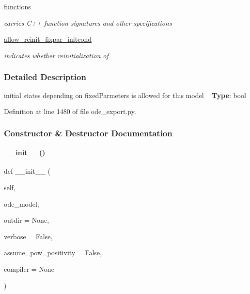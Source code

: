 \begin{DoxyCompactItemize}
\mbox{\hyperlink{classamici_1_1ode__export_1_1_o_d_e_exporter_a2cb6c540c07a402759bab624703ecdb2}{functions}}
\begin{DoxyCompactList}\small\item\em carries C++ function signatures and other specifications \end{DoxyCompactList}\item 
\mbox{\label{classamici_1_1ode__export_1_1_o_d_e_exporter_a50ba58e6df269149d17dda632a15620a}} 
\mbox{\hyperlink{classamici_1_1ode__export_1_1_o_d_e_exporter_a50ba58e6df269149d17dda632a15620a}{allow\+\_\+reinit\+\_\+fixpar\+\_\+initcond}}
\begin{DoxyCompactList}\small\item\em indicates whether reinitialization of \end{DoxyCompactList}\end{DoxyCompactItemize}


\subsubsection{Detailed Description}
initial states depending on fixed\+Parmeters is allowed for this model ~\newline
{\bfseries Type}\+: bool 

Definition at line 1480 of file ode\+\_\+export.\+py.



\subsubsection{Constructor \& Destructor Documentation}
\mbox{\label{classamici_1_1ode__export_1_1_o_d_e_exporter_aa0cb0b5f562816ee9e4f17ab38337227}} 
\paragraph{\texorpdfstring{\+\_\+\+\_\+init\+\_\+\+\_\+()}{\_\_init\_\_()}}
{\footnotesize\ttfamily def \+\_\+\+\_\+init\+\_\+\+\_\+ (\begin{DoxyParamCaption}\item[{}]{self,  }\item[{}]{ode\+\_\+model,  }\item[{}]{outdir = {\ttfamily None},  }\item[{}]{verbose = {\ttfamily False},  }\item[{}]{assume\+\_\+pow\+\_\+positivity = {\ttfamily False},  }\item[{}]{compiler = {\ttfamily None} }\end{DoxyParamCaption})}



